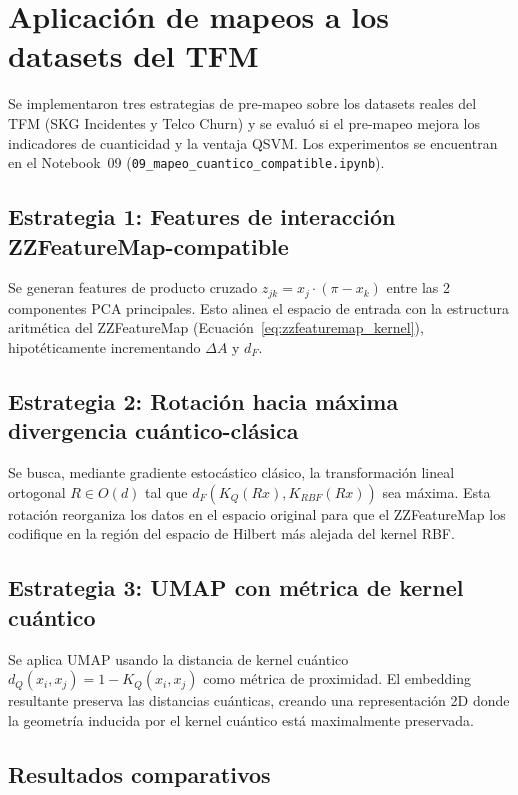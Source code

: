 \section{Aplicación de mapeos a los datasets del TFM}
\label{sec:aplicacion_mapeos}

Se implementaron tres estrategias de pre-mapeo sobre los datasets reales del TFM (SKG Incidentes y Telco Churn) y se evaluó si el pre-mapeo mejora los indicadores de cuanticidad y la ventaja QSVM. Los experimentos se encuentran en el Notebook~09 (\texttt{09\_mapeo\_cuantico\_compatible.ipynb}).

\subsection{Estrategia 1: Features de interacción ZZFeatureMap-compatible}

Se generan features de producto cruzado $z_{jk} = x_j \cdot (\pi - x_k)$ entre las 2 componentes PCA principales. Esto alinea el espacio de entrada con la estructura aritmética del ZZFeatureMap (Ecuación~\ref{eq:zzfeaturemap_kernel}), hipotéticamente incrementando $\Delta A$ y $d_F$.

\subsection{Estrategia 2: Rotación hacia máxima divergencia cuántico-clásica}

Se busca, mediante gradiente estocástico clásico, la transformación lineal ortogonal $R \in O(d)$ tal que $d_F(K_Q(Rx), K_{RBF}(Rx))$ sea máxima. Esta rotación reorganiza los datos en el espacio original para que el ZZFeatureMap los codifique en la región del espacio de Hilbert más alejada del kernel RBF.

\subsection{Estrategia 3: UMAP con métrica de kernel cuántico}

Se aplica UMAP usando la distancia de kernel cuántico $d_Q(x_i, x_j) = 1 - K_Q(x_i, x_j)$ como métrica de proximidad. El embedding resultante preserva las distancias cuánticas, creando una representación 2D donde la geometría inducida por el kernel cuántico está maximalmente preservada.

\subsection{Resultados comparativos}

